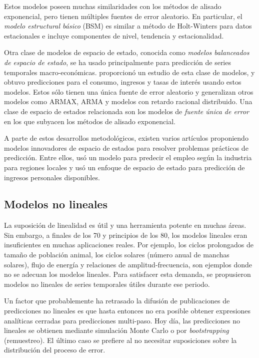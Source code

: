 \documentclass{llncs}
\begin{document}
Estos modelos poseen muchas similaridades con los métodos de alisado exponencial, pero tienen múltiples fuentes de error aleatorio. En particular, el \emph{modelo estructural básico} (BSM) es similar a método de Holt-Winters para datos estacionales e incluye componentes de nivel, tendencia y estacionalidad.

Otra clase de modelos de espacio de estado, conocida como \emph{modelos balanceados de espacio de estado}, se ha usado principalmente para predicción de series temporales macro-económicas. \cite{Mittnik1990337} proporcionó un estudio de esta clase de modelos, y \cite{Vinod1995217} obtuvo predicciones para el consumo, ingresos y tasas de interés usando estos modelos. Estos sólo tienen una única fuente de error aleatorio y generalizan otros modelos como ARMAX, ARMA y modelos con retardo racional distribuido. Una clase de espacio de estados relacionada son los modelos de \emph{fuente única de error} en los que subyacen los métodos de alisado exponencial.

A parte de estos desarrollos metodológicos, existen varios artículos proponiendo modelos innovadores de espacio de estados para resolver problemas prácticos de predicción. Entre ellos, \cite{Coomes1992473} usó un modelo para predecir el empleo según la industria para regiones locales y \cite{Patterson1995395} usó un enfoque de espacio de estado para predicción de ingresos personales disponibles. 

\subsection{Modelos no lineales}

La suposición de linealidad es útil y una herramienta potente en muchas áreas. Sin embargo, a finales de los 70 y principios de los 80, los modelos lineales eran insuficientes en muchas aplicaciones reales. Por ejemplo, los ciclos prolongados de tamaño de población animal, los ciclos solares (número anual de manchas solares), flujo de energía y relaciones de amplitud-frecuencia, son ejemplos donde no se adecuan los modelos lineales. Para satisfacer esta demanda, se propusieron modelos no lineales de series temporales útiles durante ese periodo.

Un factor que probablemente ha retrasado la difusión de publicaciones de predicciones no lineales es que hasta entonces no era posible obtener expresiones analíticas cerradas para predicciones multi-paso. Hoy día, las predicciones no lineales se obtienen mediante simulación Monte Carlo o por \emph{bootstrapping} (remuestreo). El último caso se prefiere al no necesitar suposiciones sobre la distribución del proceso de error.
\end{document}
